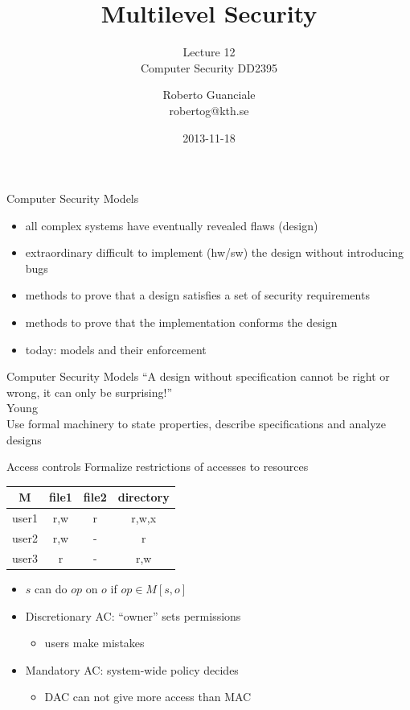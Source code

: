 \documentclass{beamer}
\title{Multilevel Security}
\subtitle{Lecture 12 \\ Computer Security DD2395}
\author[R. Guanciale]{
  Roberto Guanciale\\
  robertog@kth.se
}
\date{2013-11-18}
\begin{document}
\begin{frame}[plain]
  \titlepage
\end{frame}

\begin{frame}{Computer Security Models}
  \begin{itemize}
  \item all complex systems have eventually revealed flaws (design)
  \item extraordinary difficult to implement (hw/sw) the design
    without introducing bugs
  \item methods to prove that a design satisfies a set of security requirements
  \item methods to prove that the implementation conforms the design
  \item today: models and their enforcement
  \end{itemize}
\end{frame}

\begin{frame}{Computer Security Models}
``A design without specification cannot be right or wrong,
  it can only be surprising!''
  \\
  Young
  \\
  Use formal machinery to state properties, describe specifications
  and analyze designs
\end{frame}


\begin{frame}{Access controls}
  Formalize restrictions of accesses to resources\\[10pt]
\begin{center}
  \begin{tabular}{|c|c|c|c|}
    \hline
    M & file1 & file2 & directory \\
    \hline
    user1 & r,w & r & r,w,x \\
    \hline
    user2 & r,w & - & r \\
    \hline
    user3 & r & - & r,w \\
    \hline
  \end{tabular}
\end{center}
  \begin{itemize}
  \item $s$ can do $op$ on $o$ if $op \in M[s,o]$
  \item Discretionary AC: ``owner'' sets permissions
    \begin{itemize}
      \item users make mistakes
    \end{itemize}
  \item Mandatory AC: system-wide policy decides
    \begin{itemize}
      \item DAC can not give more access than MAC
    \end{itemize}
  \end{itemize}
\end{frame}
\end{document}
